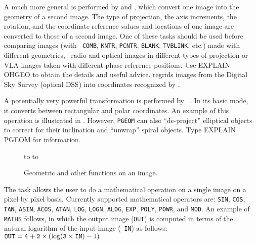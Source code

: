      A much more general  is performed
by {\tt {}} and  {\tt {}}, which convert one image
into the geometry of a second image.  The type of projection, the axis
increments, the rotation, and the coordinate reference values and
locations of one image are converted to those of a second image. One
of these tasks should be used before comparing images (with {\tt
COMB}, {\tt KNTR}, {\tt PCNTR}, {\tt BLANK}, {\tt TVBLINK}, etc.) made
with different geometries, \ie\ radio and optical images in different
types of projection or VLA images taken with different phase reference
positions.  Use {\us EXPLAIN OHGEO \CR} to obtain the details and
useful advice.  {\tt {}} regrids images from the Digital Sky
Survey (optical DSS) into coordinates recognized by \hbox{\AIPS}.

     A  potentially very powerful transformation is performed by {\tt
{}}. In its basic mode, it converts between rectangular and
polar coordinates. An example of this operation is illustrated in
.  However, {\tt PGEOM} can also ``de-project''
elliptical objects to correct for their inclination and ``unwrap''
spiral objects.  Type {\us EXPLAIN PGEOM \CR} for information.

\begin{figure}
\centering
\vspace{6pt}
\hbox to 
\vfill
\vspace{6pt}
\hbox to 
\caption{Geometric and other functions on an image.}
\label{fig:analplot}
\end{figure}


The task {\tt {}} allows the user to do a mathematical
operation on a single image on a pixel by pixel basis.  Currently
supported mathematical operators are: {\tt SIN}, {\tt COS}, {\tt TAN},
{\tt ASIN}, {\tt ACOS}, {\tt ATAN}, {\tt LOG}, {\tt LOGN}, {\tt ALOG},
{\tt EXP}, {\tt POLY}, {\tt POWR}, and \hbox{{\tt MOD}}.  An example
of {\tt MATHS} follows, in which the output image ({\tt OUT}) is
computed in terms of the natural logarithm of the input image ({\tt
IN}) as follows: $\tt OUT = 4 + 2\times (\log(3\times IN) - 1)$


